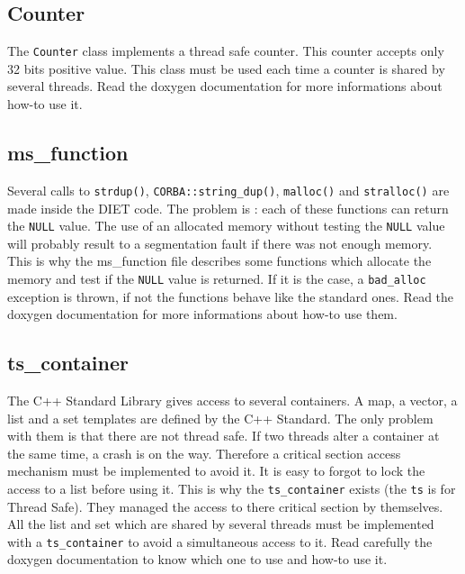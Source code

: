 
\subsection{\textsf{Counter}}

The \texttt{Counter} class implements a thread safe counter. This counter
accepts only 32 bits positive value. This class must be used each time a
counter is shared by several threads. Read the doxygen documentation for more
informations about how-to use it.

\subsection{\textsf{ms\_function}}

Several calls to \texttt{strdup()}, \texttt{CORBA::string\_dup()},
\texttt{malloc()} and \texttt{stralloc()} are made inside the DIET code. The
problem is : each of these functions can return the \texttt{NULL} value. The
use of an allocated memory without testing the \texttt{NULL} value will
probably result to a segmentation fault if there was not enough memory. This
is why the \textsf{ms\_function} file describes some functions which allocate
the memory and test if the \texttt{NULL} value is returned. If it is the case,
a \texttt{bad\_alloc} exception is thrown, if not the functions behave like the
standard ones. Read the doxygen documentation for more informations about
how-to use them.

\subsection{\textsf{ts\_container}}

The C++ Standard Library gives access to several containers. A map, a vector, a
list and a set templates are defined by the C++ Standard. The only problem with
them is that there are not thread safe. If two threads alter a container at the
same time, a crash is on the way. Therefore a critical section access mechanism
must be implemented to avoid it. It is easy to forgot to lock the access to a
list before using it. This is why the \texttt{ts\_container} exists (the
\texttt{ts} is for Thread Safe). They managed the access to there critical
section by themselves. All the list and set which are shared by several threads
must be implemented with a \texttt{ts\_container} to avoid a simultaneous
access to it. Read carefully the doxygen documentation to know which one to use
and how-to use it.
